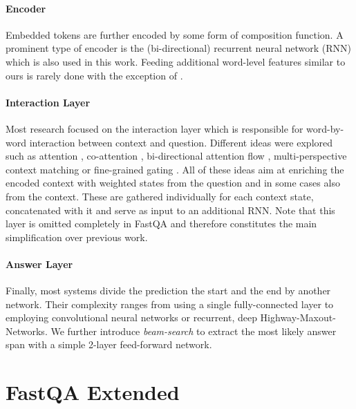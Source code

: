 \documentclass[11pt,a4paper]{article}
\begin{document}
\paragraph{Encoder} Embedded tokens are further encoded by some form of composition function. A prominent type of encoder is the (bi-directional) recurrent neural network (RNN) which is also used in this work. Feeding additional word-level features similar to ours is rarely done with the exception of .

\paragraph{Interaction Layer} Most research focused on the interaction layer which is responsible for word-by-word interaction between context and question. Different ideas were explored such as attention \cite{WangJiang2017,Yu2017}, co-attention \cite{Xiong2017}, bi-directional attention flow \cite{Seo2017}, multi-perspective context matching \cite{Wang2017} or fine-grained gating \cite{Yang2017}. All of these ideas aim at enriching the encoded context with weighted states from the question and in some cases also from the context. These are gathered individually for each context state, concatenated with it and serve as input to an additional RNN. Note that this layer is omitted completely in FastQA and therefore constitutes the main simplification over previous work.

\paragraph{Answer Layer} Finally, most systems divide the prediction the start and the end by another network. Their complexity ranges from using a single fully-connected layer \cite{Seo2017,Wang2017} to employing convolutional neural networks \cite{Trischler2017} or recurrent, deep Highway-Maxout-Networks\cite{Xiong2017}. We further introduce \textit{beam-search} to extract the most likely answer span with a simple 2-layer feed-forward network.

\section{FastQA Extended}
 
\end{document}
